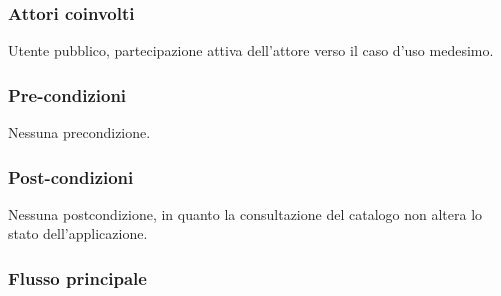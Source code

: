 \subsubsection*{Attori coinvolti}
Utente pubblico, partecipazione attiva dell'attore verso il caso d'uso medesimo.

\subsubsection*{Pre-condizioni}
Nessuna precondizione.

\subsubsection*{Post-condizioni}
Nessuna postcondizione, in quanto la consultazione del catalogo non altera lo stato dell'applicazione.

\subsubsection*{Flusso principale}

